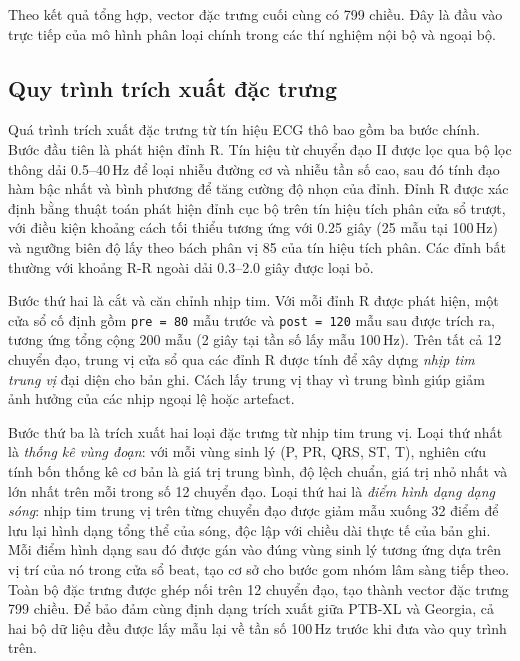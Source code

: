 \blocksep

Theo kết quả tổng hợp, vector đặc trưng cuối cùng có 799 chiều. Đây là đầu vào trực tiếp của mô hình phân loại chính trong các thí nghiệm nội bộ và ngoại bộ.

\blocksep

\subsection{Quy trình trích xuất đặc trưng}

\blocksep

Quá trình trích xuất đặc trưng từ tín hiệu ECG thô bao gồm ba bước chính. Bước đầu tiên là phát hiện đỉnh R. Tín hiệu từ chuyển đạo II được lọc qua bộ lọc thông dải 0.5--40\,Hz để loại nhiễu đường cơ và nhiễu tần số cao, sau đó tính đạo hàm bậc nhất và bình phương để tăng cường độ nhọn của đỉnh. Đỉnh R được xác định bằng thuật toán phát hiện đỉnh cục bộ trên tín hiệu tích phân cửa sổ trượt, với điều kiện khoảng cách tối thiểu tương ứng với 0.25 giây (25 mẫu tại 100\,Hz) và ngưỡng biên độ lấy theo bách phân vị 85 của tín hiệu tích phân. Các đỉnh bất thường với khoảng R-R ngoài dải 0.3--2.0 giây được loại bỏ.

\blocksep

Bước thứ hai là cắt và căn chỉnh nhịp tim. Với mỗi đỉnh R được phát hiện, một cửa sổ cố định gồm \texttt{pre = 80} mẫu trước và \texttt{post = 120} mẫu sau được trích ra, tương ứng tổng cộng 200 mẫu (2 giây tại tần số lấy mẫu 100\,Hz). Trên tất cả 12 chuyển đạo, trung vị cửa sổ qua các đỉnh R được tính để xây dựng \textit{nhịp tim trung vị} đại diện cho bản ghi. Cách lấy trung vị thay vì trung bình giúp giảm ảnh hưởng của các nhịp ngoại lệ hoặc artefact.

\blocksep

Bước thứ ba là trích xuất hai loại đặc trưng từ nhịp tim trung vị. Loại thứ nhất là \textit{thống kê vùng đoạn}: với mỗi vùng sinh lý (P, PR, QRS, ST, T), nghiên cứu tính bốn thống kê cơ bản là giá trị trung bình, độ lệch chuẩn, giá trị nhỏ nhất và lớn nhất trên mỗi trong số 12 chuyển đạo. Loại thứ hai là \textit{điểm hình dạng dạng sóng}: nhịp tim trung vị trên từng chuyển đạo được giảm mẫu xuống 32 điểm để lưu lại hình dạng tổng thể của sóng, độc lập với chiều dài thực tế của bản ghi. Mỗi điểm hình dạng sau đó được gán vào đúng vùng sinh lý tương ứng dựa trên vị trí của nó trong cửa sổ beat, tạo cơ sở cho bước gom nhóm lâm sàng tiếp theo. Toàn bộ đặc trưng được ghép nối trên 12 chuyển đạo, tạo thành vector đặc trưng 799 chiều. Để bảo đảm cùng định dạng trích xuất giữa PTB-XL và Georgia, cả hai bộ dữ liệu đều được lấy mẫu lại về tần số 100\,Hz trước khi đưa vào quy trình trên.

